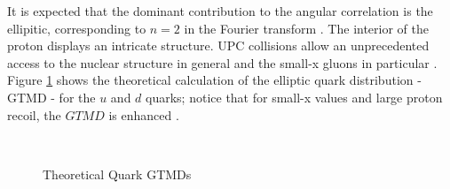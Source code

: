 It is expected that the dominant contribution to the angular correlation is the ellipitic, corresponding to $n=2$ in the Fourier transform \cite{Ollitrault:1992bk}. The interior of the proton displays an intricate structure. UPC collisions allow an unprecedented access to the nuclear structure in general and the small-x gluons in particular \cite{Altinoluk:2015dpi}. Figure \ref{fig:sixPlot} shows the theoretical calculation of the elliptic quark distribution - GTMD - for the $u$ and $d$ quarks; notice that for small-x values and large proton recoil, the $GTMD$ is enhanced \cite{Chakrabarti:2016yuw}. 

\begin{figure}[htp]
  \centering
  \label{fig:sixPlot}\caption{Theoretical Quark GTMDs \cite{Chakrabarti:2016yuw}}
  
  \\

\end{figure}

